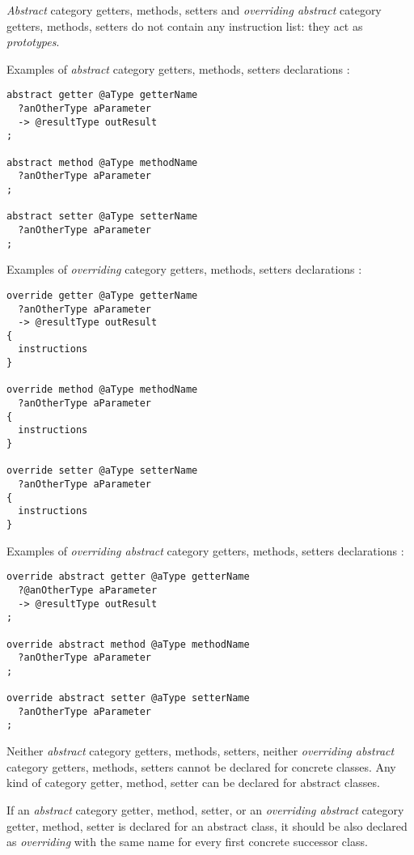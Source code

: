 \emph{Abstract} category getters, methods, setters and \emph{overriding abstract} category getters, methods, setters do not contain any instruction list: they act as \emph{prototypes}.

Examples of \emph{abstract} category getters, methods, setters declarations :
{
\begin{lstlisting}[language=galgas]
abstract getter @aType getterName
  ?anOtherType aParameter
  -> @resultType outResult
;

abstract method @aType methodName
  ?anOtherType aParameter
;

abstract setter @aType setterName
  ?anOtherType aParameter
;
\end{lstlisting}
}

Examples of \emph{overriding} category getters, methods, setters declarations :
{
\begin{lstlisting}[language=galgas]
override getter @aType getterName
  ?anOtherType aParameter
  -> @resultType outResult
{
  instructions
}

override method @aType methodName
  ?anOtherType aParameter
{
  instructions
}

override setter @aType setterName
  ?anOtherType aParameter
{
  instructions
}
\end{lstlisting}
}

Examples of \emph{overriding abstract} category getters, methods, setters declarations :
{
\begin{lstlisting}[language=galgas]
override abstract getter @aType getterName
  ?@anOtherType aParameter
  -> @resultType outResult
;

override abstract method @aType methodName
  ?anOtherType aParameter
;

override abstract setter @aType setterName
  ?anOtherType aParameter
;
\end{lstlisting}
}


Neither \emph{abstract} category getters, methods, setters, neither \emph{overriding abstract} category getters, methods, setters cannot be declared for concrete classes. Any kind of category getter, method, setter can be declared for abstract classes.

If an \emph{abstract} category getter, method, setter, or an \emph{overriding abstract} category getter, method, setter is declared for an abstract class, it should be also declared as \emph{overriding} with the same name for every first concrete successor class.

